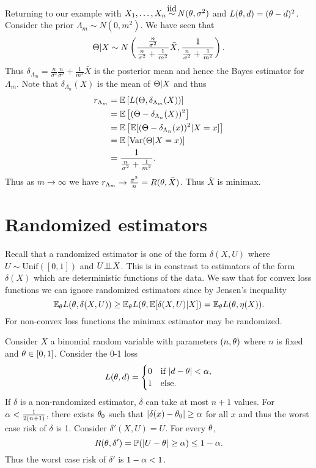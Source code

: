 \begin{ex}
    Returning to our example with $X_1,\ldots,X_n \iid N(\ta,\sigma^2)$ and $L({\theta},d) = ({\theta}-d)^2$. Consider the prior $\Lambda_m \sim N(0,m^2)$. We have seen that 
    \[{\Theta}|X \sim N\left(\frac{\frac{n}{\sigma^2}}{\frac{n}{\sigma^2}+\frac{1}{m^2}}\bar{X}, \frac{1}{\frac{n}{\sigma^2}+\frac{1}{m^2}}\right).\]
    Thus $\delta_{\Lambda_m} = \frac{n}{\sigma^2}{\frac{n}{\sigma^2}+\frac{1}{m^2}}\bar{X}$ is the posterior mean and hence the Bayes estimator for $\Lambda_m$. Note that $\delta_{\Lambda_n}(X)$ is the mean of ${\Theta}|X$ and thus
    \begin{align*}
        r_{\Lambda_m}&={\mathbb{E}}\left[L({\Theta},\delta_{\Lambda_m}(X))\right]\\
        &={\mathbb{E}}\left[({\Theta}-\delta_{\Lambda_n}(X))^2\right]\\
        &={\mathbb{E}}\left[{\mathbb{E}}[({\Theta}-\delta_{\Lambda_n}(x))^2|X=x]\right]\\
        &={\mathbb{E}}\left[\operatorname{Var}({\Theta}|X=x)\right]\\
        &=\frac{1}{\frac{n}{\sigma^2}+\frac{1}{m^2}}.
    \end{align*} 
    Thus as $m\to \infty$ we have $r_{\Lambda_m} \to \frac{\sigma^2}{n} = R({\theta},\bar{X})$. Thus $\bar{X}$ is minimax.
\end{ex}
\section{Randomized estimators}
Recall that a randomized estimator is one of the form $\delta(X,U)$ where $U \sim \text{Unif}([0,1])$ and $U{\perp\!\!\!\perp} X$. This is in constrast to estimators of the form $\delta(X)$ which are deterministic functions of the data. We saw that for convex loss functions we can ignore randomized estimators since by Jensen's inequality
\[{\mathbb{E}}_{\theta} L({\theta},\delta(X,U)) \ge {\mathbb{E}}_{\theta} L({\theta}, {\mathbb{E}}[\delta(X,U)|X]) = {\mathbb{E}}_{\theta} L({\theta}, \eta(X)). \]
For non-convex loss functions the minimax estimator may be randomized.
\begin{ex}
    Consider $X$ a binomial random variable with parameters $(n,{\theta})$ where $n$ is fixed and ${\theta} \in [0,1]$. Consider the 0-1 loss
    \begin{align*}
        L({\theta},d) = \begin{cases}
            0&\text{if } {\left\lvert d-{\theta}\right\rvert} < {\alpha},\\
            1&\text{else}.
        \end{cases}
    \end{align*}
    If $\delta$ is a non-randomized estimator, $\delta$ can take at most $n+1$ values. For ${\alpha} < \frac{1}{2(n+1)}$, there exists ${\theta}_0$ such that ${\left\lvert\delta(x)-{\theta}_0\right\rvert} \ge {\alpha}$ for all $x$ and thus the worst case risk of $\delta$ is 1. Consider $\delta'(X,U) = U$. For every ${\theta}$,
    \[R({\theta},\delta') = {\mathbb{P}}({\left\lvert U-{\theta}\right\rvert} \ge {\alpha}) \le 1-{\alpha}. \]
    Thus the worst case risk of $\delta'$ is $1-{\alpha} < 1$.
\end{ex}
